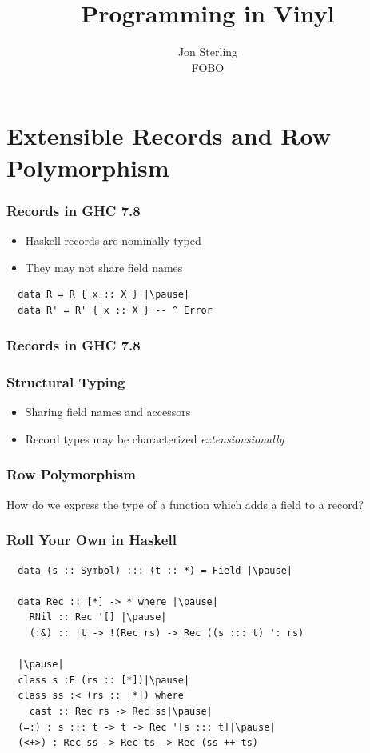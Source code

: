 \documentclass[12pt]{beamer}
\title{Programming in Vinyl}
\author{Jon Sterling\\
    FOBO
}
\begin{document}
\begin{frame}
\titlepage
\end{frame}

\section{Extensible Records and Row Polymorphism}

\begin{frame}[fragile]
  \frametitle{Records in GHC 7.8}\pause
  \begin{itemize}
    \item Haskell records are nominally typed\pause
    \item They may not share field names
  \end{itemize}
  \pause
  \begin{lstlisting}
  data R = R { x :: X } |\pause|
  data R' = R' { x :: X } -- ^ Error
  \end{lstlisting}
\end{frame}

\begin{frame}
  \frametitle{Records in GHC 7.8}
\end{frame}

\begin{frame}
  \frametitle{Structural Typing}\pause
  \begin{itemize}
    \item Sharing field names and accessors\pause
    \item Record types may be characterized \emph{extensionsionally}
  \end{itemize}
\end{frame}

\begin{frame}
  \frametitle{Row Polymorphism}\pause
  How do we express the type of a function which adds a field to a record?\pause
\end{frame}

\begin{frame}[fragile]
  \frametitle{Roll Your Own in Haskell}\pause
  \begin{lstlisting}
  data (s :: Symbol) ::: (t :: *) = Field |\pause|

  data Rec :: [*] -> * where |\pause|
    RNil :: Rec '[] |\pause|
    (:&) :: !t -> !(Rec rs) -> Rec ((s ::: t) ': rs)

  |\pause|
  class s :E (rs :: [*])|\pause|
  class ss :< (rs :: [*]) where
    cast :: Rec rs -> Rec ss|\pause|
  (=:) : s ::: t -> t -> Rec '[s ::: t]|\pause|
  (<+>) : Rec ss -> Rec ts -> Rec (ss ++ ts)
  \end{lstlisting}
\end{frame}
\end{document}
